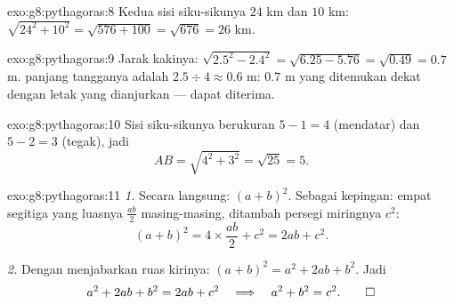\begin{solution}{exo:g8:pythagoras:8}
Kedua sisi siku-sikunya $24$ km dan $10$ km:
$\sqrt{24^2 + 10^2} = \sqrt{576 + 100} = \sqrt{676} = 26$ km.
\end{solution}

\begin{solution}{exo:g8:pythagoras:9}
Jarak kakinya: $\sqrt{2.5^2 - 2.4^2} = \sqrt{6.25 - 5.76} =
\sqrt{0.49} = 0.7$ m.  panjang tangganya adalah
$2.5 \div 4 \approx 0.6$ m: $0.7$ m yang ditemukan dekat dengan letak
yang dianjurkan --- dapat diterima.
\end{solution}

\begin{solution}{exo:g8:pythagoras:10}
Sisi siku-sikunya berukuran $5 - 1 = 4$ (mendatar) dan $5 - 2 = 3$
(tegak), jadi
\[
AB = \sqrt{4^2 + 3^2} = \sqrt{25} = 5 .
\]
\end{solution}

\begin{solution}{exo:g8:pythagoras:11}
\emph{1.} Secara langsung: $(a + b)^2$. Sebagai kepingan: empat
segitiga yang luasnya $\frac{ab}{2}$ masing-masing, ditambah persegi
miringnya $c^2$:
\[
(a + b)^2 = 4 \times \frac{ab}{2} + c^2 = 2ab + c^2 .
\]

\emph{2.} Dengan menjabarkan ruas kirinya:
$(a+b)^2 = a^2 + 2ab + b^2$. Jadi
\[
a^2 + 2ab + b^2 = 2ab + c^2
\quad\Longrightarrow\quad
a^2 + b^2 = c^2 . \qed
\]
\end{solution}

